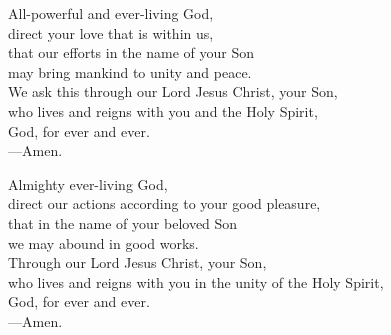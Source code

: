 \prayer


\begin{prayerverse}
All-powerful and ever-living God,\\
direct your love that is within us,\\
that our efforts in the name of your Son\\
may bring mankind to unity and peace.\\
We ask this through our Lord Jesus Christ, your Son,\\
who lives and reigns with you and the Holy Spirit,\\
God, for ever and ever.\\
{\color{red}---\thinspace}Amen.
\end{prayerverse}


\begin{prayerverse}
Almighty ever-living God,\\
direct our actions according to your good pleasure,\\
that in the name of your beloved Son\\
we may abound in good works.\\
Through our Lord Jesus Christ, your Son,\\
who lives and reigns with you in the unity of the Holy Spirit,\\
God, for ever and ever.\\
{\color{red}---\thinspace}Amen.
\end{prayerverse}

